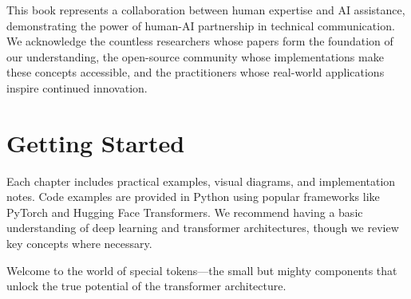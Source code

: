 This book represents a collaboration between human expertise and AI assistance, demonstrating the power of human-AI partnership in technical communication. We acknowledge the countless researchers whose papers form the foundation of our understanding, the open-source community whose implementations make these concepts accessible, and the practitioners whose real-world applications inspire continued innovation.

\section*{Getting Started}

Each chapter includes practical examples, visual diagrams, and implementation notes. Code examples are provided in Python using popular frameworks like PyTorch and Hugging Face Transformers. We recommend having a basic understanding of deep learning and transformer architectures, though we review key concepts where necessary.

Welcome to the world of special tokens—the small but mighty components that unlock the true potential of the transformer architecture.
